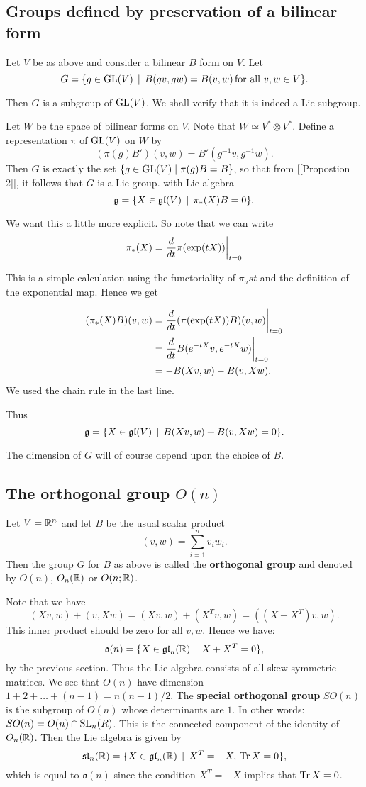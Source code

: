 \documentclass[11pt, english]{article}
\begin{document}
\subsection{Groups defined by preservation of a bilinear form}

Let $V$ be as above and consider a bilinear $B$ form on $V$. Let
$$
G = \{ g \in \operatorname{GL}(V) \, \mid  \, B(gv,gw)=B(v,w) \, \text{for all } v,w \in V \}.
$$

Then $G$ is a subgroup of $\operatorname{GL}(V)$. We shall verify that it is indeed a Lie subgroup.

Let $W$ be the space of bilinear forms on $V$. Note that $W \simeq V^\ast \otimes V^\ast$. Define a representation $\pi$ of $\operatorname{GL}(V)$ on $W$ by
$$
(\pi(g)B')(v,w) = B'(g^{-1}v,g^{-1}w).
$$
Then $G$ is exactly the set $\{  g \in \operatorname{GL}(V) \mid \pi(g) B = B \}$, so that from [[Propostion 2]], it follows that $G$ is a Lie group. with Lie algebra
$$
\mathfrak g = \{X \in \mathfrak{gl}(V) \, \mid \, \pi_\ast(X) B = 0 \}.
$$

We want this a little more explicit. So note that we can write
$$
\pi_\ast(X) = \restr{\frac{d}{dt}\pi(\exp(t X)) }{t=0}
$$

This is a simple calculation using the functoriality of $\pi_ast$ and the definition of the exponential map. Hence we get

\begin{align*}
(\pi_\ast(X) B)(v,w) &= \restr{\frac{d}{dt} (\pi(\exp(tX))B)(v,w) }{t=0} \\
&= \restr{\frac{d}{dt}  B(e^{-tX} v, e^{-tX} w)}{t=0} \\
&= -B(Xv,w)-B(v,Xw).
\end{align*}
We used the chain rule in the last line.

Thus
$$
\mathfrak g =  \{X \in \mathfrak{gl}(V) \, \mid \, B(Xv,w)+B(v,Xw) = 0 \}.
$$

The dimension of $G$ will of course depend upon the choice of $B$.

\subsection{The orthogonal group $O(n)$}

Let $V=\mathbb{R}^n$ and let $B$ be the usual scalar product
$$
(v,w) = \sum_{i=1}^n v_i w_i.
$$
Then the group $G$ for $B$ as above is called the \textbf{orthogonal group} and denoted by $O(n)$, $O_n(\mathbb{R})$ or $O(n; \mathbb{R})$. 

Note that we have
$$
(Xv,w)+(v,Xw) = (Xv,w)+(X^Tv,w)= ((X+X^T)v,w).
$$
This inner product should be zero for all $v,w$. Hence we have:
$$
\mathfrak{o}(n) = \{ X \in \mathfrak{gl}_n(\mathbb{R}) \, \mid \, X+X^T = 0 \},
$$
by the previous section. Thus the Lie algebra consists of all skew-symmetric matrices. We see that $O(n)$ have dimension $1+2+\ldots+(n-1)=n(n-1)/2$. The \textbf{special orthogonal group} $SO(n)$ is the subgroup of $O(n)$ whose determinants are $1$. In other words: $SO(n) = O(n) \cap \operatorname{SL}_n(R)$. This is the connected component of the identity of $O_n(\mathbb{R})$. Then the Lie algebra is given by
$$
\mathfrak{sl}_n(\mathbb{R}) = \{ X \in \mathfrak{gl}_n(\mathbb{R}) \, \mid \, X^T=-X, \, \operatorname{Tr} X = 0 \},
$$
which is equal to $\mathfrak{o}(n)$ since the condition $X^T=-X$ implies that $\operatorname{Tr} X = 0$.
\end{document}
